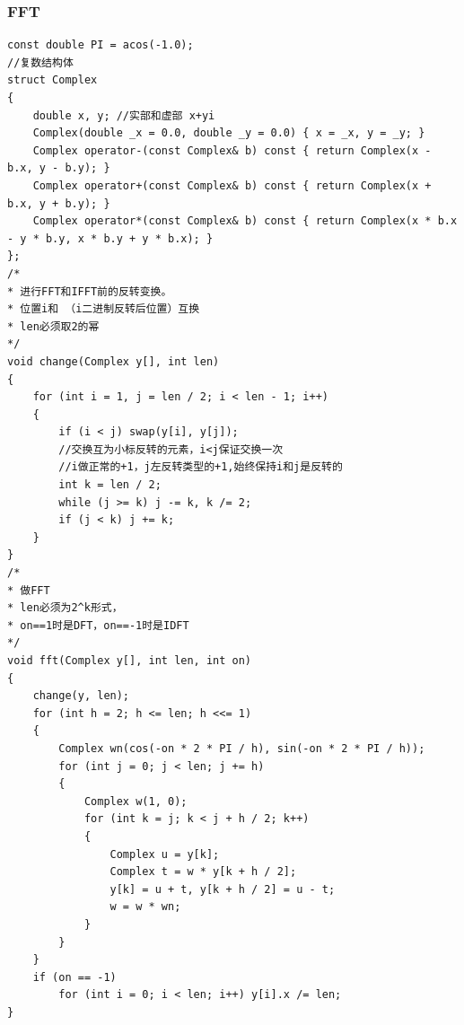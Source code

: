 \documentclass[twoside]{article}
\begin{document}
\subsubsection{FFT}
\begin{lstlisting}
const double PI = acos(-1.0);
//复数结构体
struct Complex
{
    double x, y; //实部和虚部 x+yi
    Complex(double _x = 0.0, double _y = 0.0) { x = _x, y = _y; }
    Complex operator-(const Complex& b) const { return Complex(x - b.x, y - b.y); }
    Complex operator+(const Complex& b) const { return Complex(x + b.x, y + b.y); }
    Complex operator*(const Complex& b) const { return Complex(x * b.x - y * b.y, x * b.y + y * b.x); }
};
/*
* 进行FFT和IFFT前的反转变换。
* 位置i和 （i二进制反转后位置）互换
* len必须取2的幂
*/
void change(Complex y[], int len)
{
    for (int i = 1, j = len / 2; i < len - 1; i++)
    {
        if (i < j) swap(y[i], y[j]);
        //交换互为小标反转的元素，i<j保证交换一次
        //i做正常的+1，j左反转类型的+1,始终保持i和j是反转的
        int k = len / 2;
        while (j >= k) j -= k, k /= 2;
        if (j < k) j += k;
    }
}
/*
* 做FFT
* len必须为2^k形式，
* on==1时是DFT，on==-1时是IDFT
*/
void fft(Complex y[], int len, int on)
{
    change(y, len);
    for (int h = 2; h <= len; h <<= 1)
    {
        Complex wn(cos(-on * 2 * PI / h), sin(-on * 2 * PI / h));
        for (int j = 0; j < len; j += h)
        {
            Complex w(1, 0);
            for (int k = j; k < j + h / 2; k++)
            {
                Complex u = y[k];
                Complex t = w * y[k + h / 2];
                y[k] = u + t, y[k + h / 2] = u - t;
                w = w * wn;
            }
        }
    }
    if (on == -1)
        for (int i = 0; i < len; i++) y[i].x /= len;
}
\end{lstlisting}
\end{document}
